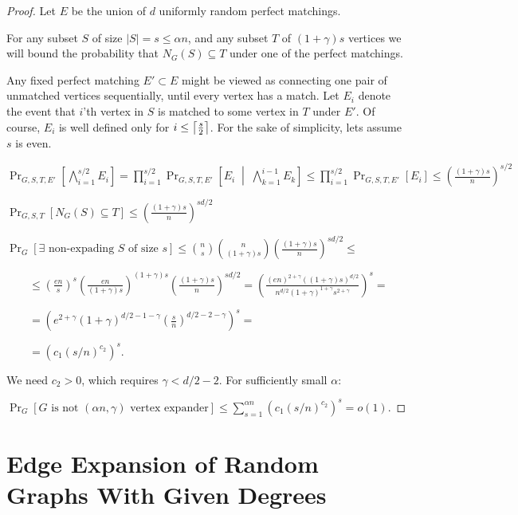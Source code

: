 \begin{proof}
    Let $E$ be the union of $d$ uniformly random perfect matchings.
    
    For any subset $S$ of size $|S|=s\leq\alpha n$,
    and any subset $T$ of $(1+\gamma)s$ vertices we will bound the probability that
    $N_G(S)\subseteq T$ under one of the perfect matchings.
    
    Any fixed perfect matching $E'\subset E$ might be viewed as connecting one pair of
    unmatched vertices sequentially, until every vertex has a match.
    Let $E_i$ denote the event that $i$'th vertex in $S$ is matched to some vertex in $T$ under $E'$.
    Of course, $E_i$ is well defined only for $i\leq{\left\lceil{\frac{s}{2}}\right\rceil}$.
    For the sake of simplicity, lets assume $s$ is even.
    
    $\Pr_{G,S,T,E'}\left[\bigwedge\limits_{i=1}^{s/2}{E_i}\right]
    =\prod_{i=1}^{s/2}{\Pr_{G,S,T,E'}\left[E_i\;\middle|\;\bigwedge\limits_{k=1}^{i-1}{E_k}\right]}
    \leq\prod_{i=1}^{s/2}{\Pr_{G,S,T,E'}[E_i]}\leq\left(\frac{(1+\gamma)s}{n}\right)^{s/2}$
    
    $\Pr_{G,S,T}[N_G(S)\subseteq T]\leq\left(\frac{(1+\gamma)s}{n}\right)^{sd/2}$
    
    $\Pr_G[\exists\text{ non-expading }S\text{ of size }s]
    \leq\binom{n}{s}\binom{n}{(1+\gamma)s}\left(\frac{(1+\gamma)s}{n}\right)^{sd/2}\leq$

    $\qquad\leq\left(\frac{en}{s}\right)^s\left(\frac{en}{(1+\gamma)s}\right)^{(1+\gamma)s}\left(\frac{(1+\gamma)s}{n}\right)^{sd/2}
    =\left(\frac{(en)^{2+\gamma}((1+\gamma)s)^{d/2}}
    {n^{d/2}(1+\gamma)^{1+\gamma}s^{2+\gamma}}\right)^s=$
    
    $\qquad=\left(e^{2+\gamma}(1+\gamma)^{d/2-1-\gamma}\left(\frac{s}{n}\right)^{d/2-2-\gamma}\right)^s=$
    
    $\qquad=\left(c_1\left(s/n\right)^{c_2}\right)^s$.
    
    We need $c_2>0$, which requires $\gamma<d/2-2$.
    For sufficiently small $\alpha$:
    
    $\Pr_G[G\text{ is not }(\alpha n,\gamma)\text{ vertex expander}]
    \leq\sum_{s=1}^{\alpha n}{(c_1(s/n)^{c_2})^s}=o(1)$.
\end{proof}

\section{Edge Expansion of Random Graphs With Given Degrees}


